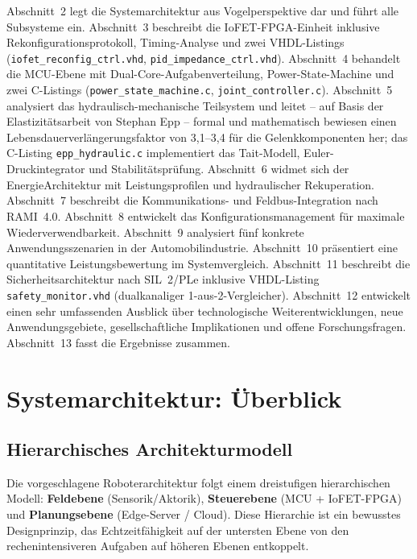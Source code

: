 ﻿\documentclass[a4paper,12pt]{scrreprt}
\theoremstyle{definition}
\begin{document}
Abschnitt~2 legt die Systemarchitektur aus Vogelperspektive dar und
führt alle Subsysteme ein. Abschnitt~3 beschreibt die IoFET-FPGA-Einheit inklusive
Rekonfigurationsprotokoll, Timing-Analyse und zwei VHDL-Listings
(\texttt{iofet\_reconfig\_ctrl.vhd}, \texttt{pid\_impedance\_ctrl.vhd}).
Abschnitt~4 behandelt die MCU-Ebene mit Dual-Core-Aufga\-benverteilung,
Power-State-Machine und zwei C-Listings (\texttt{power\_state\_machine.c}, 
\texttt{joint\_\newline controller.c}). Abschnitt~5 analysiert das
hyd\-rau\-lisch-me\-cha\-ni\-sche Teilsystem und leitet -- auf Basis der
Elastizitätsarbeit von Stephan Epp \cite{hydr2026} -- formal und
mathematisch bewiesen einen Lebensdauerverlängerungsfaktor von 3{,}1--3{,}4
für die Gelenkkomponenten her; das C-Listing \texttt{epp\_hydraulic.c}
implementiert das Tait-Modell, Euler-Druckintegrator und Stabilitätsprüfung.
Abschnitt~6 widmet sich der
EnergieArchitektur mit Leistungsprofilen und hydraulischer Rekuperation.
Abschnitt~7 beschreibt die Kommunikations- und Feldbus-Integration nach
RAMI~4.0. Abschnitt~8 entwickelt das Konfigurationsmanagement für
maximale Wiederverwendbarkeit. Abschnitt~9 analysiert fünf konkrete
Anwendungsszenarien in der Automobilindustrie. Abschnitt~10 präsentiert
eine quantitative Leistungsbewertung im Systemvergleich. Abschnitt~11
beschreibt die Sicherheitsarchitektur nach SIL~2/PLe inklusive VHDL-Listing
\texttt{safety\_monitor.vhd} (dualkanaliger 1-aus-2-Vergleicher). Abschnitt~12
entwickelt einen sehr umfassenden Ausblick über technologische
Weiterentwicklungen, neue Anwendungsgebiete, gesellschaftliche Implikationen
und offene Forschungsfragen. Abschnitt~13 fasst die Ergebnisse zusammen.

\section{Systemarchitektur: Überblick}

\subsection{Hierarchisches Architekturmodell}

Die vorgeschlagene Roboterarchitektur folgt einem dreistufigen
hierarchischen Modell: \textbf{Feldebene} (Sensorik/Aktorik),
\textbf{Steuerebene} (MCU + IoFET-FPGA) und \textbf{Planungsebene}
(Edge-Server / Cloud). Diese Hierarchie ist ein bewusstes Designprinzip,
das Echtzeitfähigkeit auf der untersten Ebene von den
rechenintensiveren Aufgaben auf höheren Ebenen entkoppelt.
\end{document}
